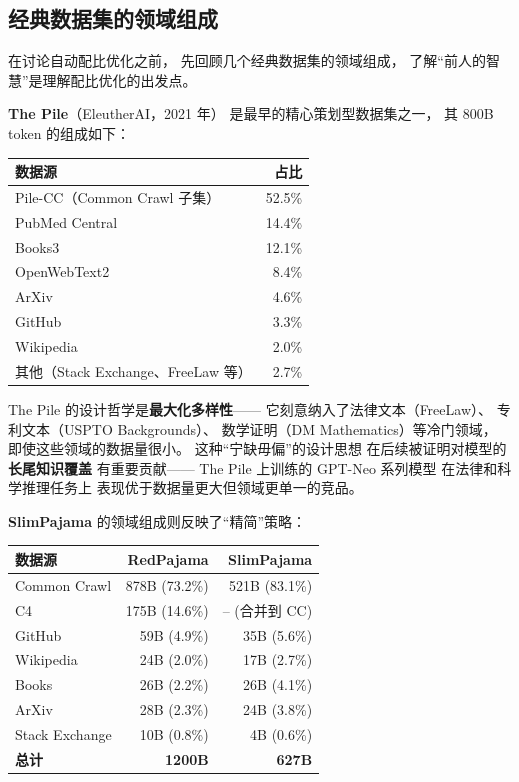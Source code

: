 \subsection{经典数据集的领域组成}

在讨论自动配比优化之前，
先回顾几个经典数据集的领域组成，
了解``前人的智慧''是理解配比优化的出发点。

\textbf{The Pile}（EleutherAI，2021 年）
是最早的精心策划型数据集之一，
其 800B token 的组成如下：

\begin{center}
\small
\begin{tabular}{lr}
\hline
\textbf{数据源} & \textbf{占比} \\
\hline
Pile-CC（Common Crawl 子集） & 52.5\% \\
PubMed Central & 14.4\% \\
Books3 & 12.1\% \\
OpenWebText2 & 8.4\% \\
ArXiv & 4.6\% \\
GitHub & 3.3\% \\
Wikipedia & 2.0\% \\
其他（Stack Exchange、FreeLaw 等） & 2.7\% \\
\hline
\end{tabular}
\end{center}

The Pile 的设计哲学是\textbf{最大化多样性}——
它刻意纳入了法律文本（FreeLaw）、
专利文本（USPTO Backgrounds）、
数学证明（DM Mathematics）等冷门领域，
即使这些领域的数据量很小。
这种``宁缺毋偏''的设计思想
在后续被证明对模型的\textbf{长尾知识覆盖}
有重要贡献——
The Pile 上训练的 GPT-Neo 系列模型
在法律和科学推理任务上
表现优于数据量更大但领域更单一的竞品。

\textbf{SlimPajama} 的领域组成则反映了``精简''策略：

\begin{center}
\small
\begin{tabular}{lrr}
\hline
\textbf{数据源} & \textbf{RedPajama} & \textbf{SlimPajama} \\
\hline
Common Crawl & 878B (73.2\%) & 521B (83.1\%) \\
C4 & 175B (14.6\%) & -- (合并到 CC) \\
GitHub & 59B (4.9\%) & 35B (5.6\%) \\
Wikipedia & 24B (2.0\%) & 17B (2.7\%) \\
Books & 26B (2.2\%) & 26B (4.1\%) \\
ArXiv & 28B (2.3\%) & 24B (3.8\%) \\
Stack Exchange & 10B (0.8\%) & 4B (0.6\%) \\
\hline
\textbf{总计} & \textbf{1200B} & \textbf{627B} \\
\hline
\end{tabular}
\end{center}

